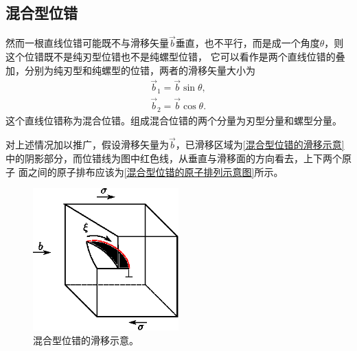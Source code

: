             \subsection{混合型位错}
                然而一根直线位错可能既不与滑移矢量$\vec{b}$垂直，也不平行，而是成一个角度$\theta$，则这个位错既不是纯刃型位错也不是纯螺型位错，
                它可以看作是两个直线位错的叠加，分别为纯刃型和纯螺型的位错，两者的滑移矢量大小为
                \begin{align}
                    \vec{b}_1=\vec{b}\sin\theta,\\
                    \vec{b}_2=\vec{b}\cos\theta.
                \end{align}
                这个直线位错称为混合位错。组成混合位错的两个分量为刃型分量和螺型分量。

                对上述情况加以推广，假设滑移矢量为$\vec{b}$，已滑移区域为\autoref{混合型位错的滑移示意}中的阴影部分，而位错线为图中红色线，从垂直与滑移面的方向看去，上下两个原子
                面之间的原子排布应该为\autoref{混合型位错的原子排列示意图}所示。
                \begin{figure}[ht]
                    \centering
                    \includegraphics[width=0.5\textwidth]{fig/混合型位错的滑移示意.eps}
                    \caption{混合型位错的滑移示意。}
                    \label{混合型位错的滑移示意}
                \end{figure}
                
